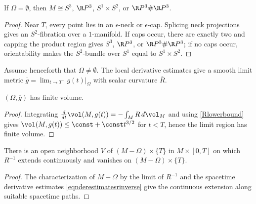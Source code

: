 \begin{lemma}
  \label{lem:kl-structure-at-first-singularity-time-rigidity-structure-at-first-singularity-time}
 \label{standard}
If $\Omega=\emptyset$, then
$M\cong S^3$, $\R P^3$, $S^1\times S^2$, or
$\R P^3\#\R P^3$.
\end{lemma}
\begin{proof}
\sketch Near $T$, every point lies in an $\epsilon$-neck or $\epsilon$-cap.
Splicing neck projections gives an $S^2$-fibration over a $1$-manifold. If
caps occur, there are exactly two and capping the product region gives
$S^3$, $\R P^3$, or $\R P^3\#\R P^3$; if no caps occur, orientability makes the
$S^2$-bundle over $S^1$ equal to $S^1\times S^2$.
\end{proof}

Assume henceforth that $\Omega\ne\emptyset$. The local derivative estimates
give a smooth limit metric $\overline g=\lim_{t\to T^-}g(t)|_\Omega$ with scalar
curvature $\overline R$.

\begin{lemma}
  \label{lem:kl-structure-at-first-singularity-time-volume-lemma}
 \label{volumeomega}
$(\Omega,\overline g)$ has finite volume.
\end{lemma}
\begin{proof}
\sketch Integrating
$\frac{d}{dt}\vol(M,g(t))=-\int_MR\,d\vol_M$ and using
\eqref{Rlowerbound} gives $\vol(M,g(t))\leq\const+\const t^{3/2}$ for
$t<T$, hence the limit region has finite volume.
\end{proof}

\begin{lemma}
  \label{lem:kl-structure-at-first-singularity-time-existence-structure-at-first-singularity-time}

\label{lemrinverseextends}
There is an open neighborhood $V$ of $(M-\Omega)\times\{T\}$ in
$M\times[0,T]$ on which $R^{-1}$ extends continuously and vanishes on
$(M-\Omega)\times\{T\}$.
\end{lemma}
\begin{proof}
\sketch The characterization of $M-\Omega$ by the limit of $R^{-1}$ and the
spacetime derivative estimates \eqref{eqnderestimatesrinverse} give the
continuous extension along suitable spacetime paths.
\end{proof}

